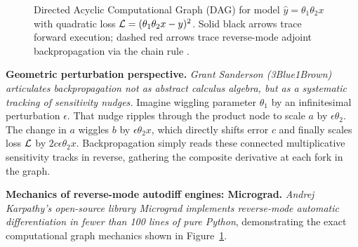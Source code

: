 \documentclass[../../main.tex]{subfiles}
\begin{document}
\begin{figure}[htbp]
{%
}
\caption{Directed Acyclic Computational Graph (DAG) for model $\hat{y} = \theta_1 \theta_2 x$ with quadratic loss $\mathcal{L} = (\theta_1 \theta_2 x - y)^2$. Solid black arrows trace forward execution; dashed red arrows trace reverse-mode adjoint backpropagation via the chain rule \cite{rumelhart1986}.}
\label{fig:adjoint_scalar_graph}
\end{figure}

\noindent\textbf{Geometric perturbation perspective.}\newline
\textit{Grant Sanderson (3Blue1Brown) articulates backpropagation not as abstract calculus algebra, but as a systematic tracking of sensitivity nudges.} Imagine wiggling parameter $\theta_1$ by an infinitesimal perturbation $\epsilon$. That nudge ripples through the product node to scale $a$ by $\epsilon \theta_2$. The change in $a$ wiggles $b$ by $\epsilon \theta_2 x$, which directly shifts error $c$ and finally scales loss $\mathcal{L}$ by $2c \epsilon \theta_2 x$. Backpropagation simply reads these connected multiplicative sensitivity tracks in reverse, gathering the composite derivative at each fork in the graph.

\medskip
\noindent\textbf{Mechanics of reverse-mode autodiff engines: Micrograd.}\newline
\textit{Andrej Karpathy's open-source library Micrograd implements reverse-mode automatic differentiation in fewer than 100 lines of pure Python}, demonstrating the exact computational graph mechanics shown in Figure~\ref{fig:adjoint_scalar_graph}.
\end{document}
